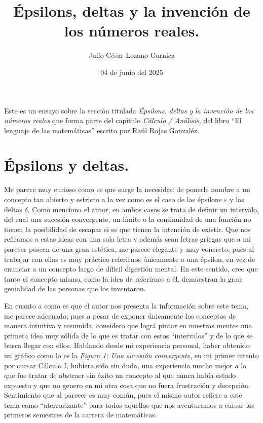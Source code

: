 \documentclass[a4paper,10pt]{article}
\title{\huge{Épsilons, deltas y la invención de los números reales.}}
\author{Julio César Lozano Garnica}
\date{04 de junio del 2025}
\begin{document}
\maketitle

Este es un ensayo sobre la sección titulada \textit{Épsilons, deltas y la invención de los números reales} que forma parte del capítulo \textit{Cálculo / Análisis}, del libro \enquote{El lenguaje de las matemáticas} escrito por Raúl Rojas Gonzaléz. 

\section*{Épsilons y deltas.}

Me parece muy curioso como es que surge la necesidad de ponerle nombre a un concepto tan abierto y estricto a la vez como es el caso de las épsilons $\varepsilon$ y las deltas $\delta$. Como menciona el autor, en ambos casos se trata de definir un intervalo, del cual una sucesión convergente, un límite o la continuidad de una función no tienen la posibilidad de escapar si es que tienen la intención de existir. Que nos refiramos a estas ideas con una sola letra y además sean letras griegas que a mi parecer poseen de una gran estética, me parece elegante y muy concreto, pues al trabajar con ellas es muy práctico referirnos únicamente a una épsilon, en vez de enunciar a un concepto largo de díficil digestión mental. En este sentido, creo que tanto el concepto mismo, como la idea de  referirnos a él, demuestran la gran genialidad de las personas que los inventaron.

En cuanto a como es que el autor nos presenta la información sobre este tema, me parece adecuado; pues a pesar de exponer únicamente los conceptos de manera intuitiva y resumida, considero que lográ pintar en nuestras mentes una primera idea muy sólida de lo que es tratar con estos \enquote{intervalos} y de lo que se busca llegar con ellos. Hablando desde mi experiencia personal, haber obtenido un gráfico como lo es la \textit{ Figura 1: Una sucesión convergente}, en mi primer intento por cursar Cálculo I, hubiera sido sin duda, una experiencia mucho mejor a lo que fue tratar de abstraer sin éxito un concepto al que nunca había estado expuesto y que no genero en mi otra cosa que no fuera frustración y decepción. Sentimiento que al parecer es muy común, pues el mismo autor refiere a este tema como \enquote{aterrorizante} para todos aquellos que nos aventuramos a cursar los primeros semestres de la carrera de matemáticas.
\end{document}
